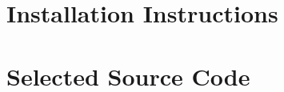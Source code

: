 \appendix
\appendixpage
\addappheadtotoc

\section{Installation Instructions}
\subsection{}

\section{Selected Source Code}
